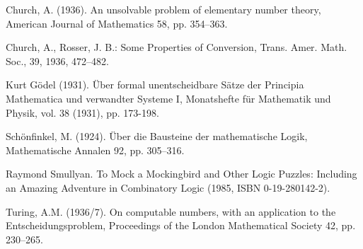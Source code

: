 \begin{thebibliography}{99}

 Church, A. (1936). An unsolvable problem of elementary number theory, American
Journal of Mathematics 58, pp. 354–363.

 Church, A., Rosser, J. B.: Some Properties of Conversion, Trans. Amer. Math. Soc., 39, 1936, 472–482.


 Kurt Gödel (1931). Über formal unentscheidbare Sätze der
  Principia Mathematica und verwandter Systeme I, Monatshefte für Mathematik
  und Physik, vol. 38 (1931), pp. 173-198.

 Schönfinkel, M. (1924). Über die Bausteine der mathematische Logik, Mathematische
Annalen 92, pp. 305–316.

 Raymond Smullyan. To Mock a Mockingbird and Other Logic Puzzles: Including an Amazing Adventure in Combinatory Logic (1985, ISBN 0-19-280142-2).

 Turing, A.M. (1936/7). On computable numbers, with an application to the
Entscheidungsproblem, Proceedings of the London Mathematical Society
42, pp. 230–265.

\end{thebibliography}
